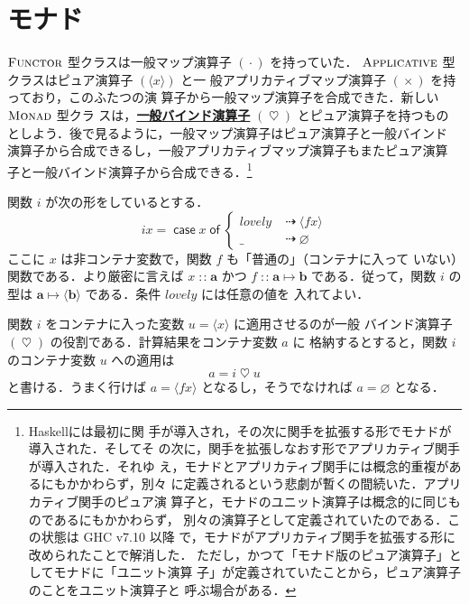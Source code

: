 \documentclass[a5paper,twoside,fleqn,draft]{jsbook}
\newcommand{\programminglanguage}[1]{\textsf{#1}}
\newcommand{\haskell}{\programminglanguage{Haskell}}
\newcommand{\keyword}[1]{{\underline{\textbf{#1}}}}
\newcommand{\mKeyword}[1]{\mathsf{#1}}
\newcommand{\mCaseKeyword}{\mKeyword{case}}
\newcommand{\mOfKeyword}{\mKeyword{of}}
\DeclareMathOperator{\mCaseKW}{\mCaseKeyword}
\DeclareMathOperator{\mOfKW}{\mOfKeyword}
\newcommand{\mPureNothing}{\varnothing}
\newcommand{\mSpecialVar}[1]{\mathit{#1}}
\newcommand{\mLovelyVar}{\mSpecialVar{lovely}}
\DeclareMathOperator{\mAppMap}{\times}
\DeclareMathOperator{\mBind}{\heartsuit}
\DeclareMathOperator{\mIfSo}{\dashrightarrow}
\DeclareMathOperator{\mIn}{{:\!:}}
\DeclareMathOperator{\mMap}{\cdot}
\DeclareMathOperator{\mMapsTo}{\mapsto}
\newcommand{\mType}[1]{\mathbf{#1}} %
\newcommand{\mA}{\mType{a}}
\newcommand{\mB}{\mType{b}}
\newcommand{\mPureType}[1]{\langle\mType{#1}\rangle}
\newcommand{\mPureWith}[1]{\langle#1\rangle}
\newcommand{\mTypeClass}[1]{\textsc{#1}} %
\newcommand{\mApplicativeTypeClass}{\mTypeClass{Applicative}}
\newcommand{\mFunctorTypeClass}{\mTypeClass{Functor}}
\newcommand{\mMonadTypeClass}{\mTypeClass{Monad}}
\newcommand{\mCaseOf}[1]{\mCaseKW#1\mOfKW}
\begin{document}
\section{モナド}

$\mFunctorTypeClass$ 型クラスは一般マップ演算子 $(\mMap)$ を持っていた．
$\mApplicativeTypeClass$ 型クラスはピュア演算子 $(\mPureWith{x})$ と一
般アプリカティブマップ演算子 $(\mAppMap)$ を持っており，このふたつの演
算子から一般マップ演算子を合成できた．新しい $\mMonadTypeClass$ 型クラ
スは，\keyword{一般バインド演算子} $(\mBind)$ とピュア演算子を持つもの
としよう．後で見るように，一般マップ演算子はピュア演算子と一般バインド
演算子から合成できるし，一般アプリカティブマップ演算子もまたピュア演算
子と一般バインド演算子から合成できる．\footnote{\haskell には最初に関
手が導入され，その次に関手を拡張する形でモナドが導入された．そしてそ
の次に，関手を拡張しなおす形でアプリカティブ関手が導入された．それゆ
え，モナドとアプリカティブ関手には概念的重複があるにもかかわらず，別々
に定義されるという悲劇が暫くの間続いた．アプリカティブ関手のピュア演
算子と，モナドのユニット演算子は概念的に同じものであるにもかかわらず，
別々の演算子として定義されていたのである．この状態は GHC v7.10 以降
で，モナドがアプリカティブ関手を拡張する形に改められたことで解消した．
ただし，かつて「モナド版のピュア演算子」としてモナドに「ユニット演算
子」が定義されていたことから，ピュア演算子のことをユニット演算子と
呼ぶ場合がある．}

関数 $i$ が次の形をしているとする．
\begin{equation}
  \label{eq:def-of-i}
  ix=\mCaseOf{x}\begin{cases}
    \mLovelyVar
    &\mIfSo\mPureWith{fx}\\
    \_
    &\mIfSo\mPureNothing
  \end{cases}
\end{equation}
ここに $x$ は非コンテナ変数で，関数 $f$ も「普通の」（コンテナに入って
  いない）関数である．より厳密に言えば $x\mIn\mA$ かつ
$f\mIn\mA\mMapsTo\mB$ である．従って，関数 $i$ の型は
$\mA\mMapsTo\mPureType{b}$ である．条件 $\mLovelyVar$ には任意の値を
  入れてよい．

関数 $i$ をコンテナに入った変数 $u=\mPureWith{x}$ に適用させるのが一般
バインド演算子 $(\mBind)$ の役割である．計算結果をコンテナ変数 $a$ に
格納するとすると，関数 $i$ のコンテナ変数 $u$ への適用は
\begin{equation}
\label{eq:i-love-u}
a=i\mBind u
\end{equation}
と書ける．うまく行けば $a=\mPureWith{fx}$ となるし，そうでなければ
$a=\mPureNothing$ となる．
\end{document}
